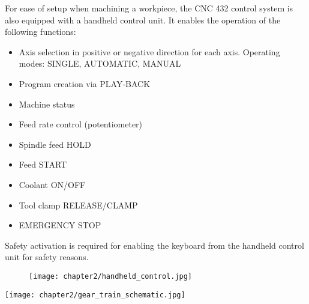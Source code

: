 \setcounter{section}{4}
\setcounter{page}{2}

For ease of setup when machining a workpiece, the CNC 432 control system is also equipped with a handheld control unit. It enables the operation of the following functions:

\begin{itemize}[itemsep=1pt,parsep=0pt]
    \item Axis selection in positive or negative direction for each axis. Operating modes: SINGLE, AUTOMATIC, MANUAL
    \item Program creation via PLAY-BACK
    \item Machine status
    \item Feed rate control (potentiometer)
    \item Spindle feed HOLD
    \item Feed START
    \item Coolant ON/OFF
    \item Tool clamp RELEASE/CLAMP
    \item EMERGENCY STOP
\end{itemize}

Safety activation is required for enabling the keyboard from the handheld control unit for safety reasons.

\vspace{0.3cm}


\vspace{0.3cm}


\vspace{-0.6cm}

\begin{center}
\end{center}

\vspace{-0.5cm}

\begin{figure}[h]
    \centering
    \texttt{[image: chapter2/handheld\_control.jpg]}
\end{figure}

\setcounter{section}{10}
\begin{minipage}{\textwidth}
    \begin{adjustwidth}{-2cm}{-3cm}
        \centering
        \texttt{[image: chapter2/gear\_train\_schematic.jpg]}
    \end{adjustwidth}
    \label{fig:gear_train}
\end{minipage}

